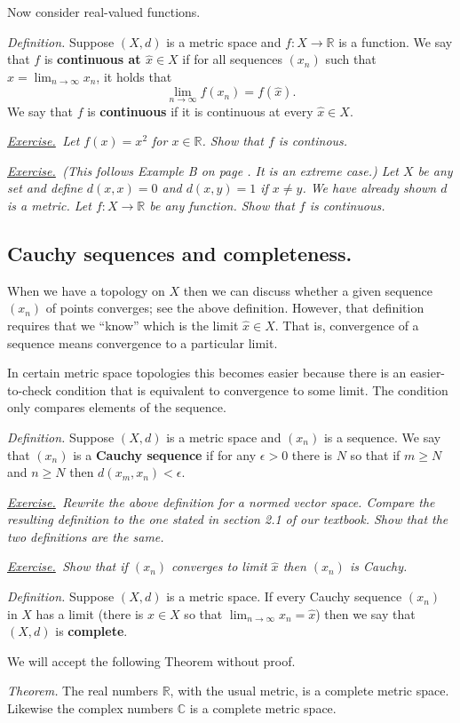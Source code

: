 \documentclass[12pt]{article}
\newcommand{\CC}{\mathbb{C}}
\newcommand{\RR}{\mathbb{R}}
\newcommand{\eps}{\epsilon}
\newcommand{\sect}[1]{\subsection*{#1.}}
\newcommand{\defin}{\emph{Definition.}\,\,}
\newcommand{\thm}{\emph{Theorem.}\,\,}
\newcommand{\exer}[2]{\emph{\underline{Exercise.}\, #2} \vspace*{#1mm}}
\begin{document}
Now consider real-valued functions.

\defin Suppose $(X,d)$ is a metric space and $f:X\to \RR$ is a function.  We say that $f$ is \textbf{continuous at $\hat x\in X$} if for all sequences $(x_n)$ such that $\hat x = \lim_{n\to\infty} x_n$, it holds that
    $$\lim_{n\to\infty} f(x_n) = f(\hat x).$$
We say that $f$ is \textbf{continuous} if it is continuous at every $\hat x\in X$.

\exer{40}{Let $f(x)=x^2$ for $x\in \RR$.  Show that $f$ is continous.}

\exer{40}{(This follows Example B on page \pageref{topic:metric}.  It is an extreme case.)  Let $X$ be any set and define $d(x,x)=0$ and $d(x,y)=1$ if $x\ne y$.  We have already shown $d$ is a metric.  Let $f:X\to\RR$ be \emph{any} function.  Show that $f$ is continuous.}


\sect{Cauchy sequences and completeness}

When we have a topology on $X$ then we can discuss whether a given sequence $(x_n)$ of points converges; see the above definition.  However, that definition requires that we ``know'' which is the limit $\hat x \in X$.  That is, convergence of a sequence means convergence to a particular limit.

In certain metric space topologies this becomes easier because there is an easier-to-check condition that is equivalent to convergence to some limit.  The condition only compares elements of the sequence.

\defin Suppose $(X,d)$ is a metric space and $(x_n)$ is a sequence.  We say that $(x_n)$ is a \textbf{Cauchy sequence} if for any $\eps>0$ there is $N$ so that if $m \ge N$ and $n\ge N$ then $d(x_m,x_n)<\eps$.

\exer{50}{Rewrite the above definition for a normed vector space.  Compare the resulting definition to the one stated in section 2.1 of our textbook.  Show that the two definitions are the same.}

\exer{40}{Show that if $(x_n)$ converges to limit $\hat x$ then $(x_n)$ is Cauchy.}

\defin Suppose $(X,d)$ is a metric space.  If every Cauchy sequence $(x_n)$ in $X$ has a limit (there is $\hat x\in X$ so that $\lim_{n\to\infty} x_n=\hat x$) then we say that $(X,d)$ is \textbf{complete}.

We will accept the following Theorem without proof.

\thm The real numbers $\RR$, with the usual metric, is a complete metric space.  Likewise the complex numbers $\CC$ is a complete metric space.
\end{document}
